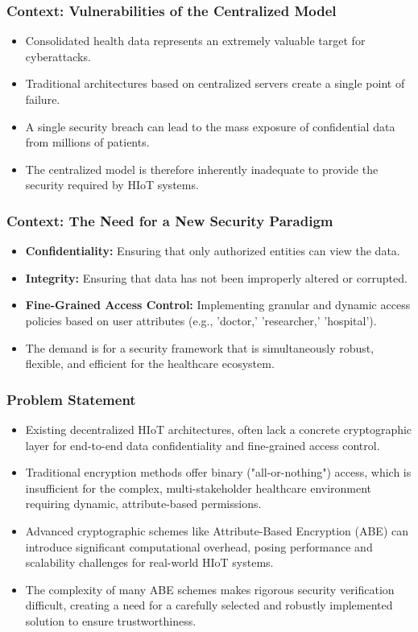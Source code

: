 \documentclass{beamer}
\begin{document}
\begin{frame}
\frametitle{Context: Vulnerabilities of the Centralized Model}
\begin{itemize}
    \item Consolidated health data represents an extremely valuable target for cyberattacks.
    \item Traditional architectures based on centralized servers create a single point of failure.
    \item A single security breach can lead to the mass exposure of confidential data from millions of patients.
    \item The centralized model is therefore inherently inadequate to provide the security required by HIoT systems.
\end{itemize}
\end{frame}

\begin{frame}
\frametitle{Context: The Need for a New Security Paradigm}
\begin{itemize}
    \item \textbf{Confidentiality:} Ensuring that only authorized entities can view the data.
    \item \textbf{Integrity:} Ensuring that data has not been improperly altered or corrupted.
    \item \textbf{Fine-Grained Access Control:} Implementing granular and dynamic access policies based on user attributes (e.g., 'doctor,' 'researcher,' 'hospital').
    \item The demand is for a security framework that is simultaneously robust, flexible, and efficient for the healthcare ecosystem.
\end{itemize}
\end{frame}

\begin{frame}
\frametitle{Problem Statement}
\begin{itemize}
    \item Existing decentralized HIoT architectures, often lack a concrete cryptographic layer for end-to-end data confidentiality and fine-grained access control.
    \item Traditional encryption methods offer binary ("all-or-nothing") access, which is insufficient for the complex, multi-stakeholder healthcare environment requiring dynamic, attribute-based permissions.
    \item Advanced cryptographic schemes like Attribute-Based Encryption (ABE) can introduce significant computational overhead, posing performance and scalability challenges for real-world HIoT systems.
    \item The complexity of many ABE schemes makes rigorous security verification difficult, creating a need for a carefully selected and robustly implemented solution to ensure trustworthiness.
\end{itemize}
\end{frame}
\end{document}
